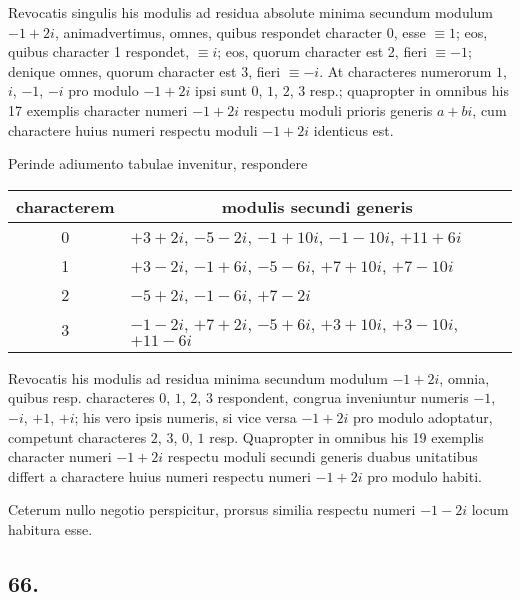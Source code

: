 \documentclass[twoside,12pt, showframe]{memoir}
\begin{document}
Revocatis singulis his modulis ad residua absolute minima secundum modulum \(-1+2 i\), animadvertimus, omnes, quibus respondet character \(0\), esse \(\equiv 1\); eos, quibus character 1 respondet, \(\equiv i\); eos, quorum character est 2, fieri \(\equiv-1\); denique omnes, quorum character est 3, fieri \(\equiv-i\). At characteres numerorum \(1\), \( i\), \(-1\), \(-i\) pro modulo \(-1+2 i\) ipsi sunt \(0\), \(1\), \(2\), \(3\) resp.; quapropter in omnibus his 17 exemplis character numeri \(-1+2 i\) respectu moduli prioris generis \(a+b i\), cum charactere huius numeri respectu moduli \(-1+2 i\) identicus est.

Perinde adiumento tabulae invenitur, respondere
\begin{center}
\begin{tabular}{c|l}
characterem & \multicolumn{1}{c}{modulis secundi generis} \\
\hline
0 & \(+3+2 i\), \(-5-2 i\), \(-1+10 i\), \(-1-10 i\), \(+11+6 i\) \\
1 & \(+3-2 i\), \(-1+6 i\), \(-5-6 i\), \(+7+10 i\), \(+7-10 i\) \\
2 & \(-5+2 i\), \(-1-6 i\), \(+7-2 i\) \\
3 & \(-1-2 i\), \(+7+2 i\), \(-5+6 i\), \(+3+10 i\), \(+3-10 i\), \(+11-6 i\) \\
\end{tabular}
\end{center}
 
Revocatis his modulis ad residua minima secundum modulum \(-1+2 i\), omnia, quibus resp. characteres \(0\), \(1\), \(2\), \(3\) respondent, congrua inveniuntur numeris \(-1\), \(-i\), \(+1\), \(+i\); his vero ipsis numeris, si vice versa \(-1+2 i\) pro modulo adoptatur, competunt characteres \(2\), \(3\), \(0\), \(1\) resp. Quapropter in omnibus his 19 exemplis character numeri \(-1+2 i\) respectu moduli secundi generis duabus unitatibus differt a charactere huius numeri respectu numeri \(-1+2 i\) pro modulo habiti.
 
Ceterum nullo negotio perspicitur, prorsus similia respectu numeri \(-1-2 i\) locum habitura esse.

\subsection*{66.}
 
\end{document}
